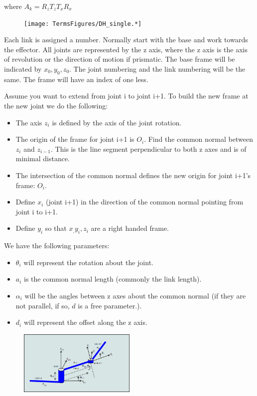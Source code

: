 where \(A_k = R_z T_z T_x R_x\)

\begin{figure}
\centering
\texttt{[image: TermsFigures/DH\_single.*]}
\caption{}
\end{figure}

Each link is assigned a number. Normally start with the base and work
towards the effector. All joints are represented by the z axis, where
the z axis is the axis of revolution or the direction of motion if
prismatic. The base frame will be indicated by \(x_0, y_0, z_0\). The
joint numbering and the link numbering will be the same. The frame will
have an index of one less.

Assume you want to extend from joint i to joint i+1. To build the new
frame at the new joint we do the following:

\begin{itemize}
\tightlist
\item
  The axis \(z_i\) is defined by the axis of the joint rotation.
\item
  The origin of the frame for joint i+1 is \(O_i\). Find the common
  normal between \(z_i\) and \(z_{i-1}\). This is the line segment
  perpendicular to both z axes and is of minimal distance.
\item
  The intersection of the common normal defines the new origin for joint
  i+1's frame: \(O_i\).
\item
  Define \(x_i\) (joint i+1) in the direction of the common normal
  pointing from joint i to i+1.
\item
  Define \(y_i\) so that \(x_, y_i, z_i\) are a right handed frame.
\end{itemize}

We have the following parameters:

\begin{itemize}
\tightlist
\item
  \(\theta_i\) will represent the rotation about the joint.
\item
  \(a_i\) is the common normal length (commonly the link length).
\item
  \(\alpha_i\) will be the angles between z axes about the common normal
  (if they are not parallel, if so, \(d\) is a free parameter.).
\item
  \(d_i\) will represent the offset along the z axis.
\end{itemize}

\begin{figure}
\centering
\includegraphics[width=0.5\textwidth,height=\textheight]{TermsFigures/DH.png}
\caption{}
\end{figure}

